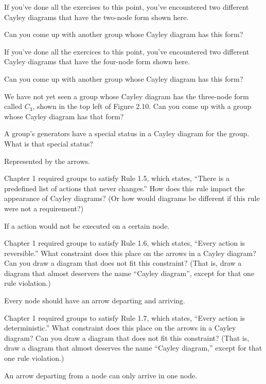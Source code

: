 \begin{questions}
	\question If you've done all the exercises to this point, you've encountered two different Cayley diagrams that have the two-node form shown here.
	\par Can you come up with another group whose Cayley diagram has this form?
	
	\question If you've done all the exercices to this point, you've encountered two different Cayley diagrams that have the four-node form shown here.
	\par Can you come up with another group whose Cayley diagram has this form?
	
	\question We have not yet seen a group whose Cayley diagram has the three-node form called $C_3$, shown in the top left of Figure 2.10. Can you come up with a group whose Cayley diagram has that form?
	
	\question A group's generators have a special status in a Cayley diagram for the group. What is that special status?
	\begin{solution}
		Represented by the arrows.
	\end{solution}
	
	\question Chapter 1 required groups to satisfy Rule 1.5, which states, ``There is a predefined list of actions that never changes.'' How does this rule impact the appearance of Cayley diagrams? (Or how would diagrams be different if this rule were not a requirement?)
	\begin{solution}
		If a action would not be executed on a certain node.
	\end{solution}
	
	\question Chapter 1 required groups to satisfy Rule 1.6, which states, ``Every action is reversible.'' What constraint does this place on the arrows in a Cayley diagram? Can you draw a diagram that does not fit this constraint? (That is, draw a diagram that almost deservers the name ``Cayley diagram'', except for that one rule violation.)
	\begin{solution}
		Every node should have an arrow departing and arriving.
	\end{solution}

	\question Chapter 1 required groups to satisfy Rule 1.7, which states, ``Every action is deterministic.'' What constraint does this place on the arrows in a Cayley diagram? Can you draw a diagram that does not fit this constraint? (That is, draw a diagram that almost deserves the name ``Cayley diagram,'' except for that one rule violation.)
	\begin{solution}
		An arrow departing from a node can only arrive in one node.
	\end{solution}
	

\end{questions}
